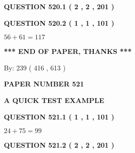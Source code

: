 \documentclass[12pt]{article}
\begin{document}
   
  
\vspace{0.2in}
  
{\textbf{\Large{QUESTION
520.1 
 ( 2 , 2 , 201 )
}}}
  
  
  
\vspace{0.2in}
  
{\textbf{\Large{QUESTION
520.2 
 ( 1 , 1 , 101 )
}}}
  
  
 
 

$ %
56 +  %
61=   %
117$
 
 
   
   
 \vspace{0.2in}
 
   
   
   
   
\vspace{1.0in} 
{\textbf{\large{ *** END OF PAPER, THANKS *** }}} 
   
   
\hspace{1.0in} By: 
 239 ( 416 ,  613 )
   
   
   
   
\newpage 
\setcounter{page}{ 
   521001 } 
   
   
   
   
 {\textbf{ \Large{ PAPER NUMBER  521  }}}
   
   
\vspace{0.2in}
   
   
   
   
   
   
 \vspace{0.2in}
{\LARGE {\textbf{ A QUICK TEST EXAMPLE}}}
   
   
  
\vspace{0.2in}
  
{\textbf{\Large{QUESTION
521.1 
 ( 1 , 1 , 101 )
}}}
  
  
 
 

$ %
24 +  %
75=   %
99$
 
 
  
\vspace{0.2in}
  
{\textbf{\Large{QUESTION
521.2 
 ( 2 , 2 , 201 )
}}}
  
  
   
\end{document}
